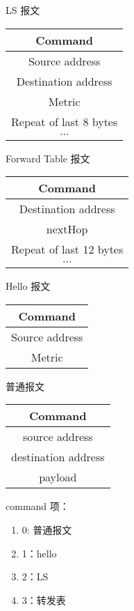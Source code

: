 	LS 报文
	\begin{table}[H]
	\centering
		\begin{tabular}{|c|}
			\hline
			Command \\
			\hline
			Source address \\
			\hline
			Destination address \\
			\hline
			Metric \\
			\hline
			Repeat of last 8 bytes \\
			\hline
			$\cdots$ \\
			\hline
		\end{tabular}		
	\end{table}
	Forward Table 报文
	\begin{table}[H]
	\centering
		\begin{tabular}{|c|}
			\hline
			Command \\
			\hline
			Destination address \\
			\hline
			nextHop \\
			\hline
			Repeat of last 12 bytes \\
			\hline
			$\cdots$ \\
			\hline
		\end{tabular}		
	\end{table}
	Hello 报文
	\begin{table}[H]
	\centering
		\begin{tabular}{|c|}
			\hline
			Command        \\
			\hline
			Source address \\
			\hline
			Metric         \\
			\hline
		\end{tabular}
	\end{table}
	普通报文
	\begin{table}[H]
	\centering
		\begin{tabular}{|c|}
			\hline
			Command \\
			\hline
			source address \\
			\hline
			destination address \\
			\hline
			payload \\
			\hline
		\end{tabular}		
	\end{table}
	command 项：
	\begin{enumerate}[]
		\item 0: 普通报文
		\item 1：hello
		\item 2：LS
		\item 3：转发表
	\end{enumerate}
